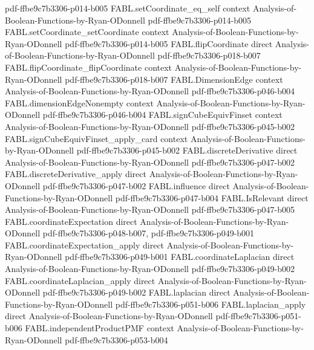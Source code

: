 \begin{theorem}
  {pdf-ffbe9c7b3306-p014-b005}
\proofstep
  {FABL.setCoordinate_eq_self}
  {context}
  {Analysis-of-Boolean-Functions-by-Ryan-ODonnell}
  {pdf-ffbe9c7b3306-p014-b005}
\proofstep
  {FABL.setCoordinate_setCoordinate}
  {context}
  {Analysis-of-Boolean-Functions-by-Ryan-ODonnell}
  {pdf-ffbe9c7b3306-p014-b005}
\proofstep
  {FABL.flipCoordinate}
  {direct}
  {Analysis-of-Boolean-Functions-by-Ryan-ODonnell}
  {pdf-ffbe9c7b3306-p018-b007}
\proofstep
  {FABL.flipCoordinate_flipCoordinate}
  {context}
  {Analysis-of-Boolean-Functions-by-Ryan-ODonnell}
  {pdf-ffbe9c7b3306-p018-b007}
\proofstep
  {FABL.DimensionEdge}
  {context}
  {Analysis-of-Boolean-Functions-by-Ryan-ODonnell}
  {pdf-ffbe9c7b3306-p046-b004}
\proofstep
  {FABL.dimensionEdgeNonempty}
  {context}
  {Analysis-of-Boolean-Functions-by-Ryan-ODonnell}
  {pdf-ffbe9c7b3306-p046-b004}
\proofstep
  {FABL.signCubeEquivFinset}
  {context}
  {Analysis-of-Boolean-Functions-by-Ryan-ODonnell}
  {pdf-ffbe9c7b3306-p045-b002}
\proofstep
  {FABL.signCubeEquivFinset_apply_card}
  {context}
  {Analysis-of-Boolean-Functions-by-Ryan-ODonnell}
  {pdf-ffbe9c7b3306-p045-b002}
\proofstep
  {FABL.discreteDerivative}
  {direct}
  {Analysis-of-Boolean-Functions-by-Ryan-ODonnell}
  {pdf-ffbe9c7b3306-p047-b002}
\proofstep
  {FABL.discreteDerivative_apply}
  {direct}
  {Analysis-of-Boolean-Functions-by-Ryan-ODonnell}
  {pdf-ffbe9c7b3306-p047-b002}
\proofstep
  {FABL.influence}
  {direct}
  {Analysis-of-Boolean-Functions-by-Ryan-ODonnell}
  {pdf-ffbe9c7b3306-p047-b004}
\proofstep
  {FABL.IsRelevant}
  {direct}
  {Analysis-of-Boolean-Functions-by-Ryan-ODonnell}
  {pdf-ffbe9c7b3306-p047-b005}
\proofstep
  {FABL.coordinateExpectation}
  {direct}
  {Analysis-of-Boolean-Functions-by-Ryan-ODonnell}
  {pdf-ffbe9c7b3306-p048-b007,
    pdf-ffbe9c7b3306-p049-b001}
\proofstep
  {FABL.coordinateExpectation_apply}
  {direct}
  {Analysis-of-Boolean-Functions-by-Ryan-ODonnell}
  {pdf-ffbe9c7b3306-p049-b001}
\proofstep
  {FABL.coordinateLaplacian}
  {direct}
  {Analysis-of-Boolean-Functions-by-Ryan-ODonnell}
  {pdf-ffbe9c7b3306-p049-b002}
\proofstep
  {FABL.coordinateLaplacian_apply}
  {direct}
  {Analysis-of-Boolean-Functions-by-Ryan-ODonnell}
  {pdf-ffbe9c7b3306-p049-b002}
\proofstep
  {FABL.laplacian}
  {direct}
  {Analysis-of-Boolean-Functions-by-Ryan-ODonnell}
  {pdf-ffbe9c7b3306-p051-b006}
\proofstep
  {FABL.laplacian_apply}
  {direct}
  {Analysis-of-Boolean-Functions-by-Ryan-ODonnell}
  {pdf-ffbe9c7b3306-p051-b006}
\proofstep
  {FABL.independentProductPMF}
  {context}
  {Analysis-of-Boolean-Functions-by-Ryan-ODonnell}
  {pdf-ffbe9c7b3306-p053-b004}

\end{theorem}
